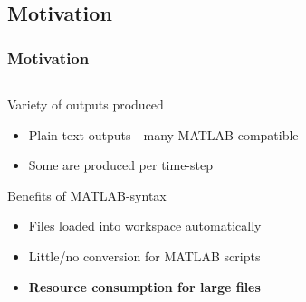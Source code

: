 \subsection{Motivation}
\begin{frame}
    \frametitle{Motivation}
    \begin{columns}[T]
        \begin{column}{0.48\textwidth}
            Variety of outputs produced
            \begin{itemize}
                \item Plain text outputs - many MATLAB-compatible 
                \item Some are produced per time-step
            \end{itemize}
            Benefits of MATLAB-syntax\footnotemark[1]
            \begin{itemize}
                \item Files loaded into workspace automatically
                \item Little/no conversion for MATLAB scripts
                \item \textbf{Resource consumption for large files}
            \end{itemize}
        \end{column}
    \end{columns}
\end{frame}

